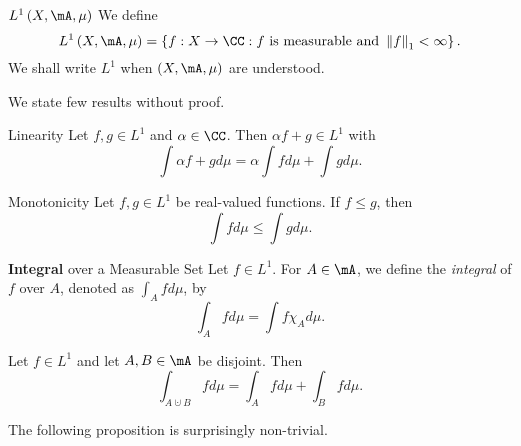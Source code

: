 \documentclass[pmath451]{subfiles}
\begin{document}
    \begin{notation}{$L^1\left( X,\mA,\mu \right)$}
        We define
        \begin{equation*}
            L^1\left( X,\mA,\mu \right) = \left\lbrace f:X\to\CC : \text{$f$ is measurable and } \left\lVert f \right\rVert_{1}<\infty \right\rbrace.
        \end{equation*}
        We shall write $L^1$ when $\left( X,\mA,\mu \right)$ are understood.
    \end{notation}

    \np We state few results without proof.
    
    \begin{prop}{Linearity}
        Let $f,g\in L^1$ and $\alpha\in\CC$. Then $\alpha f+g\in L^1$ with
        \begin{equation*}
            \int\alpha f+gd\mu = \alpha\int fd\mu + \int gd\mu.
        \end{equation*}
    \end{prop}
    
    \rruleline

    \begin{prop}{Monotonicity}
        Let $f,g\in L^1$ be real-valued functions. If $f\leq g$, then
        \begin{equation*}
            \int fd\mu \leq \int gd\mu.
        \end{equation*}
    \end{prop}

    \rruleline
    
    \begin{definition}{\textbf{Integral} over a Measurable Set}
        Let $f\in L^1$. For $A\in\mA$, we define the \emph{integral} of $f$ over $A$, denoted as $\int_Afd\mu$, by
        \begin{equation*}
            \int_Afd\mu = \int f\chi_Ad\mu.
        \end{equation*}
    \end{definition}
    
    \begin{prop}{}
        Let $f\in L^1$ and let $A,B\in\mA$ be disjoint. Then
        \begin{equation*}
            \int_{A\cupdot B} fd\mu = \int_Afd\mu + \int_Bfd\mu.
        \end{equation*}
    \end{prop}

    \rruleline
    
    \np The following proposition is surprisingly non-trivial.
\end{document}
